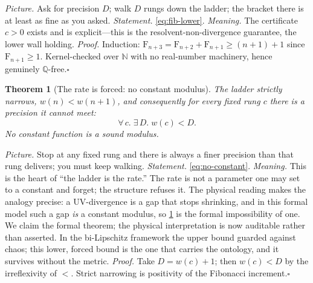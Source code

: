 \documentclass[11pt,letterpaper]{article}
\theoremstyle{plain}
\newtheorem{theorem}{Theorem}[section]
\theoremstyle{definition}
\theoremstyle{remark}
\newcommand{\NN}{\mathbb{N}}
\newcommand{\QQ}{\mathbb{Q}}
\newcommand{\fib}{\mathrm{F}}                           %
\begin{document}
\noindent\emph{Picture.} Ask for precision $D$; walk $D$ rungs down the ladder;
the bracket there is at least as fine as you asked. \emph{Statement.}
\cref{eq:fib-lower}. \emph{Meaning.} The certificate $c>0$ exists and is
explicit---this is the resolvent-non-divergence guarantee, the lower wall holding.
\emph{Proof.} Induction: $\fib_{n+3}=\fib_{n+2}+\fib_{n+1}\ge(n+1)+1$ since
$\fib_{n+1}\ge1$. Kernel-checked over $\NN$ with no real-number machinery, hence
genuinely $\QQ$-free.\hfill$\square$

\begin{theorem}[The rate is forced: no constant modulus]\label{thm:modforced}
The ladder strictly narrows, $w(n)<w(n+1)$, and consequently for every fixed rung
$c$ there is a precision it cannot meet:
\begin{equation}\label{eq:no-constant}
  \forall\, c.\;\exists\, D.\; w(c) < D .
\end{equation}
No constant function is a sound modulus.
\end{theorem}

\noindent\emph{Picture.} Stop at any fixed rung and there is always a finer
precision than that rung delivers; you must keep walking. \emph{Statement.}
\cref{eq:no-constant}. \emph{Meaning.} This is the heart of ``the ladder is the
rate.'' The rate is not a parameter one may set to a constant and forget; the
structure refuses it. The physical reading makes the analogy precise:
a UV-divergence is a gap that stops shrinking, and in this formal model such a gap
\emph{is} a constant modulus, so \cref{thm:modforced} is the formal impossibility
of one. We claim the formal theorem; the physical interpretation is now auditable
rather than asserted. In the bi-Lipschitz framework the
upper bound guarded against chaos; this lower,
forced bound is the one that carries the ontology, and it survives without
the metric. \emph{Proof.} Take $D=w(c)+1$; then $w(c)<D$ by the irreflexivity of
$<$. Strict narrowing is positivity of the Fibonacci increment.\hfill$\square$
\end{document}

